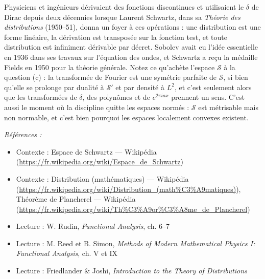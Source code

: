 \documentclass[11pt]{article}
\newenvironment{refs}{\par\small\noindent\emph{Références :}\begin{itemize}\setlength\itemsep{0pt}}{\end{itemize}\normalsize}
\begin{document}
\noindent Physiciens et ingénieurs dérivaient des fonctions discontinues et utilisaient le $\delta$ de
Dirac depuis deux décennies lorsque Laurent Schwartz, dans sa \textit{Théorie des distributions} (1950--51),
donna un foyer à ces opérations : une distribution est une forme linéaire, la dérivation est transposée
sur la fonction test, et toute distribution est infiniment dérivable par décret. Sobolev avait eu l'idée
essentielle en 1936 dans ses travaux sur l'équation des ondes, et Schwartz a reçu la médaille Fields en
1950 pour la théorie générale. Notez ce qu'achète l'espace $ \mathcal{S} $ à la question (c) : la
transformée de Fourier est une symétrie parfaite de $ \mathcal{S} $, si bien qu'elle se prolonge par
dualité à $ \mathcal{S}' $ et par densité à $ L^2 $, et c'est seulement alors que les transformées de
$ \delta $, des polynômes et de $ e^{2\pi i a x} $ prennent un sens. C'est aussi le moment où la
discipline quitte les espaces normés : $ \mathcal{S} $ est métrisable mais non normable, et c'est bien
pourquoi les espaces localement convexes existent.

\begin{refs}
\item Contexte : Espace de Schwartz --- Wikipédia (\url{https://fr.wikipedia.org/wiki/Espace_de_Schwartz})
\item Contexte : Distribution (mathématiques) --- Wikipédia (\url{https://fr.wikipedia.org/wiki/Distribution_(math%C3%A9matiques)}), Théorème de Plancherel --- Wikipédia (\url{https://fr.wikipedia.org/wiki/Th%C3%A9or%C3%A8me_de_Plancherel})
\item Lecture : W. Rudin, \textit{Functional Analysis}, ch. 6--7
\item Lecture : M. Reed et B. Simon, \textit{Methods of Modern Mathematical Physics I: Functional Analysis}, ch. V et IX
\item Lecture : Friedlander \& Joshi, \textit{Introduction to the Theory of Distributions}
\end{refs}

\bigskip
\end{document}
